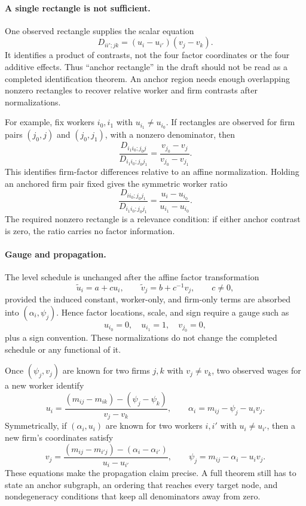 \documentclass[11pt]{article}
\begin{document}
\paragraph{A single rectangle is not sufficient.}
One observed rectangle supplies the scalar equation
\[
D_{ii';jk}=(u_i-u_{i'})(v_j-v_k).
\]
It identifies a product of contrasts, not the four factor coordinates or the
four additive effects.  Thus ``anchor rectangle'' in the draft should not be
read as a completed identification theorem.  An anchor region needs enough
overlapping nonzero rectangles to recover relative worker and firm contrasts
after normalizations.

For example, fix workers \(i_0,i_1\) with \(u_{i_1}\neq u_{i_0}\).  If
rectangles are observed for firm pairs \((j_0,j)\) and \((j_0,j_1)\), with a
nonzero denominator, then
\[
\frac{D_{i_1i_0;j_0j}}
     {D_{i_1i_0;j_0j_1}}
=
\frac{v_{j_0}-v_j}{v_{j_0}-v_{j_1}}.
\tag{firm-contrast-ratio}
\]
This identifies firm-factor differences relative to an affine normalization.
Holding an anchored firm pair fixed gives the symmetric worker ratio
\[
\frac{D_{ii_0;j_0j_1}}
     {D_{i_1i_0;j_0j_1}}
=
\frac{u_i-u_{i_0}}{u_{i_1}-u_{i_0}}.
\tag{worker-contrast-ratio}
\]
The required nonzero rectangle is a relevance condition: if either anchor
contrast is zero, the ratio carries no factor information.

\paragraph{Gauge and propagation.}
The level schedule is unchanged after the affine factor transformation
\[
\widetilde u_i=a+c u_i,
\qquad
\widetilde v_j=b+c^{-1}v_j,
\qquad c\neq0,
\]
provided the induced constant, worker-only, and firm-only terms are absorbed
into \((\alpha_i,\psi_j)\).  Hence factor locations, scale, and sign require a
gauge such as
\[
u_{i_0}=0,
\quad u_{i_1}=1,
\quad v_{j_0}=0,
\]
plus a sign convention.  These normalizations do not change the completed
schedule or any functional of it.

Once \((\psi_j,v_j)\) are known for two firms \(j,k\) with
\(v_j\neq v_k\), two observed wages for a new worker identify
\[
u_i
=
\frac{(m_{ij}-m_{ik})-(\psi_j-\psi_k)}{v_j-v_k},
\qquad
\alpha_i=m_{ij}-\psi_j-u_iv_j.
\tag{add-worker}
\]
Symmetrically, if \((\alpha_i,u_i)\) are known for two workers \(i,i'\)
with \(u_i\neq u_{i'}\), then a new firm's coordinates satisfy
\[
v_j
=
\frac{(m_{ij}-m_{i'j})-(\alpha_i-\alpha_{i'})}{u_i-u_{i'}},
\qquad
\psi_j=m_{ij}-\alpha_i-u_iv_j.
\tag{add-firm}
\]
These equations make the propagation claim precise.  A full theorem still has
to state an anchor subgraph, an ordering that reaches every target node, and
nondegeneracy conditions that keep all denominators away from zero.
\end{document}
